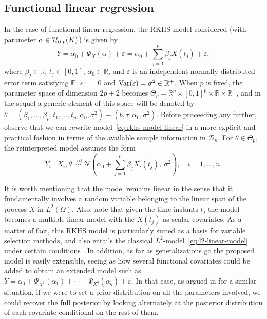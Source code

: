 \documentclass[ba]{imsart}
\numberwithin{equation}{section}
\theoremstyle{plain}
\renewcommand{\epsilon}{\varepsilon}
\newcommand{\R}{\mathbb{R}}
\newcommand{\E}{\mathbb{E}}
\newcommand{\Hcal}{\ensuremath\mathcal{H}}
\newcommand{\Var}{\ensuremath\operatorname{Var}}
\begin{document}
\subsection{Functional linear regression}\label{sec:rkhs-linear-model}

In the case of functional linear regression, the RKHS model considered (with parameter \(\alpha\in \Hcal_{0,p}(K)\)) is given by
\begin{equation}\label{eq:rkhs-model-linear}
  Y = \alpha_0 + \Psi_X(\alpha) + \epsilon = \alpha_0 + \sum_{j=1}^p \beta_j X(t_j) + \epsilon,
\end{equation}
where \(\beta_j \in \R\), \(t_j \in [0, 1]\), \(\alpha_0\in\R\), and \(\epsilon\) is an independent normally-distributed error term satisfying \(\E[\epsilon]=0\) and \(\Var(\epsilon)=\sigma^2\in \R^+\). When \(p\) is fixed, the parameter space of dimension \(2p + 2\) becomes \(\Theta_p = \R^p \times [0, 1]^p \times \R \times \R^+\), and in the sequel a generic element of this space will be denoted by \(\theta = (\beta_1,\dots, \beta_p, t_1,\dots, t_p, \alpha_0, \sigma^2) \equiv (b, \tau, \alpha_0, \sigma^2)\). Before proceeding any further, observe that we can rewrite model~\eqref{eq:rkhs-model-linear} in a more explicit and practical fashion in terms of the available sample information in \(\mathcal D_n\). For \(\theta \in \Theta_p\), the reinterpreted model assumes the form
\begin{equation}\label{eq:rkhs-model-linear-2}
  Y_i \mid X_i, \theta \ \stackrel{\text{i.i.d.}}{\sim} \mathcal N\left(\alpha_0 + \sum_{j=1}^p \beta_j X_i(t_j), \ \sigma^2\right), \quad i =1,\dots, n.
\end{equation}

It is worth mentioning that the model remains linear in the sense that it fundamentally involves a random variable belonging to the linear span of the process \(X\) in \(L^2(\Omega)\). Also, note that given the time instants \(t_j\) the model becomes a multiple linear model with the \(X(t_j)\) as scalar covariates. As a matter of fact, this RKHS model is particularly suited as a basis for variable selection methods, and also entails the classical \(L^2\)-model~\eqref{eq:l2-linear-model} under certain conditions \citep[see][Sec.~3]{berrendero2020general}. In addition, as far as generalizations go the proposed model is easily extensible, seeing as how several functional covariates could be added to obtain an extended model such as \(Y=\alpha_0 + \Psi_{X^{1}}(\alpha_1) + \cdots + \Psi_{X^{q}}(\alpha_q) + \epsilon\). In that case, as argued in \citet{grollemund2019bayesian} for a similar situation, if we were to set a prior distribution on all the parameters involved, we could recover the full posterior by looking alternately at the posterior distribution of each covariate conditional on the rest of them.
\end{document}
